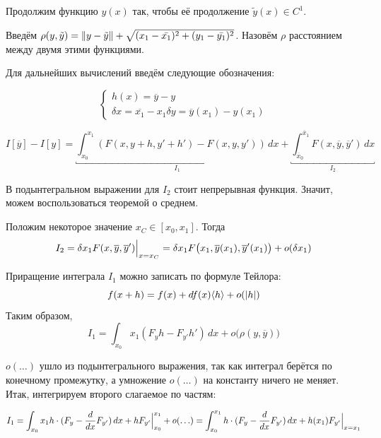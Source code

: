 \documentclass[12pt]{article}
\begin{document}
			Продолжим функцию $y(x)$ так, чтобы её продолжение $\tilde{y}(x) \in C^1$.
	
			Введём $\rho(y, \tilde{y}) = \left\| y - \tilde{y} \right\| + \sqrt{(x_1 - \bar{x_1})^2 + (y_1 - \bar{y_1})^2}$. Назовём $\rho$ расстоянием между двумя этими функциями.

			Для дальнейших вычислений введём следующие обозначения:
	
			$$
				\left\{
				\begin{aligned}
					h(x) = \overline{y} - y \\
					\delta x = \overline{x_1} - x_1
					\delta y = \overline{y}(x_1) - y(x_1)
				\end{aligned}
				\right.
			$$

			$$I[\overline{y}] - I[y] = 
	  			\underbracket{\int_{x_0}^{x_1} (F(x, y + h, y' + h') - F(x, y, y')) \,dx}_{I_1} +
	  			\underbracket{\int_{\overline{x}_0}^{\overline{x}_1} F(x, \overline{y}, \overline{y}') \,dx}_{I_2}$$
	  
			В подынтегральном выражении для $I_2$ стоит непрерывная функция. Значит, можем воспользоваться
			теоремой о среднем.
	
	
			Положим некоторое значение $x_C \in [x_0, x_1]$. Тогда 
			$$I_2 = \delta x_1 F(x, \overline{y}, \overline{y}')\Big|_{x = x_C}^{} 
			= \delta x_1 F\big(x_1, \overline{y}(x_1), \overline{y}'(x_1)\big) + o(\delta x_1)$$
	
			Приращение интеграла $I_1$ можно записать по формуле Тейлора:
			$$f(x + h) = f(x) + df(x) \langle h \rangle + o(\left| h \right|)$$
			Таким образом, 
			$$I_1 = \int_{x_0}{x_1} (F_yh - F_{y'}h') \,dx + o\big(\rho(y, \overline{y})\big)$$
	
			$o(\ldots)$ ушло из подынтегрального выражения, так как интеграл берётся по конечному промежутку,
			а умножение $o(\ldots)$ на константу ничего не меняет. Итак, интегрируем второго слагаемое по
			частям:
	
			$$I_1 = \int_{x_0}{x_1} h\cdot(F_y - \frac{d}{dx}F_{y'}) \,dx + hF_{y'}\Big|_{x_0}^{x_1} + o(\ldots) = \int_{x_0}^{x_1} h\cdot(F_y - \frac{d}{dx}F_{y'}) \,dx + h(x_1) F_{y'}\Big|_{x = x_1}^{}$$

\end{document}
